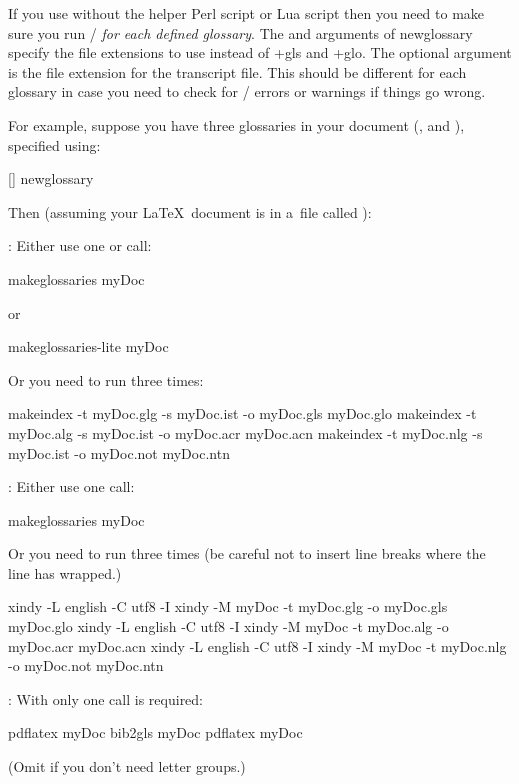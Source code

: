 \documentclass[titlepage=false,oneside,
 fontsize=12pt,captions=tableheading]{scrarticle}
\begin{document}
If you use  without the helper 
Perl script or  Lua script then you need to
make sure you run \slash{} \emph{for each
defined glossary}. The  and  arguments of
\gls{newglossary} specify the file extensions to use instead of
\ext+{gls} and \ext+{glo}. The optional argument  is the
file extension for the transcript file. This should be different for
each glossary in case you need to check for
\slash{} errors or warnings if things go
wrong.

For example, suppose you have three glossaries in your document
(,  and ), 
specified using:
\begin{codebox}
[]
\gls{newglossary}
\end{codebox}
Then (assuming your \LaTeX\ document is in a~file called
):

\begin{description}
\item{}:
Either use one  or
 call:
\begin{terminal}
makeglossaries myDoc
\end{terminal}
or
\begin{terminal}
makeglossaries-lite myDoc
\end{terminal}
Or you need to run  three times:
\begin{terminal}
makeindex -t myDoc.glg -s myDoc.ist -o myDoc.gls myDoc.glo
makeindex -t myDoc.alg -s myDoc.ist -o myDoc.acr myDoc.acn
makeindex -t myDoc.nlg -s myDoc.ist -o myDoc.not myDoc.ntn
\end{terminal}

\item{}:
Either use one  call:
\begin{terminal}
makeglossaries myDoc
\end{terminal}
Or you need to run  three times (be careful not to insert
line breaks where the line has wrapped.)
\begin{terminal}
xindy -L english -C utf8 -I xindy -M myDoc -t myDoc.glg -o myDoc.gls myDoc.glo
xindy -L english -C utf8 -I xindy -M myDoc -t myDoc.alg -o myDoc.acr myDoc.acn
xindy -L english -C utf8 -I xindy -M myDoc -t myDoc.nlg -o myDoc.not myDoc.ntn
\end{terminal}

\item{}:
With  only one call is required:
\begin{terminal}
pdflatex myDoc
bib2gls  myDoc
pdflatex myDoc
\end{terminal}
(Omit  if you don't need letter groups.)
\end{description}
\end{document}
